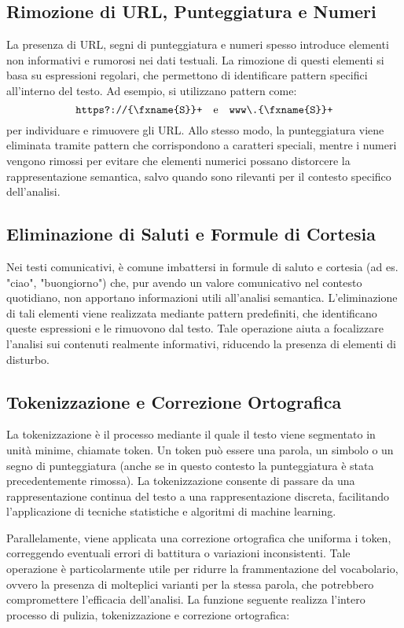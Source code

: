 \subsection{Rimozione di URL, Punteggiatura e Numeri}
La presenza di URL, segni di punteggiatura e numeri spesso introduce elementi non informativi e rumorosi nei dati testuali. La rimozione di questi elementi si basa su espressioni regolari, che permettono di identificare pattern specifici all'interno del testo. Ad esempio, si utilizzano pattern come:
\[
\verb|https?://\S+| \quad \text{e} \quad \verb|www\.\S+|
\]
per individuare e rimuovere gli URL. Allo stesso modo, la punteggiatura viene eliminata tramite pattern che corrispondono a caratteri speciali, mentre i numeri vengono rimossi per evitare che elementi numerici possano distorcere la rappresentazione semantica, salvo quando sono rilevanti per il contesto specifico dell'analisi.

\subsection{Eliminazione di Saluti e Formule di Cortesia}
Nei testi comunicativi, è comune imbattersi in formule di saluto e cortesia (ad es. "ciao", "buongiorno") che, pur avendo un valore comunicativo nel contesto quotidiano, non apportano informazioni utili all'analisi semantica. L'eliminazione di tali elementi viene realizzata mediante pattern predefiniti, che identificano queste espressioni e le rimuovono dal testo. Tale operazione aiuta a focalizzare l'analisi sui contenuti realmente informativi, riducendo la presenza di elementi di disturbo.

\subsection{Tokenizzazione e Correzione Ortografica}
La tokenizzazione è il processo mediante il quale il testo viene segmentato in unità minime, chiamate token. Un token può essere una parola, un simbolo o un segno di punteggiatura (anche se in questo contesto la punteggiatura è stata precedentemente rimossa). La tokenizzazione consente di passare da una rappresentazione continua del testo a una rappresentazione discreta, facilitando l'applicazione di tecniche statistiche e algoritmi di machine learning. 

Parallelamente, viene applicata una correzione ortografica che uniforma i token, correggendo eventuali errori di battitura o variazioni inconsistenti. Tale operazione è particolarmente utile per ridurre la frammentazione del vocabolario, ovvero la presenza di molteplici varianti per la stessa parola, che potrebbero compromettere l'efficacia dell'analisi. La funzione seguente realizza l'intero processo di pulizia, tokenizzazione e correzione ortografica:

